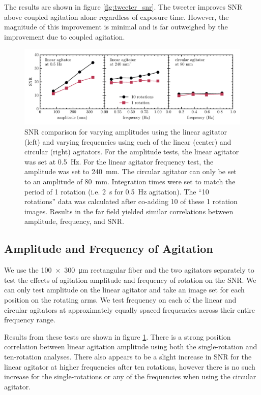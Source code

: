 \documentclass[twocolumn]{emulateapj}
\begin{document}
The results are shown in figure \ref{fig:tweeter_snr}. The tweeter improves SNR above coupled agitation alone regardless of exposure time. However, the magnitude of this improvement is minimal and is far outweighed by the improvement due to coupled agitation.

\begin{figure}[t]
\centering
	\includegraphics[width=\textwidth]{images/amp_freq_snr.pdf}
	\caption{SNR comparison for varying amplitudes using the linear agitator (left) and varying frequencies using each of the linear (center) and circular (right) agitators. For the amplitude tests, the linear agitator was set at \SI{0.5}{\hertz}. For the linear agitator frequency test, the amplitude was set to \SI{240}{\milli\meter}. The circular agitator can only be set to an amplitude of \SI{80}{\milli\meter}. Integration times were set to match the period of 1 rotation (i.e. \SI{2}{\second} for \SI{0.5}{\hertz} agitation). The ``10 rotations'' data was calculated after co-adding 10 of these 1 rotation images. Results in the far field yielded similar correlations between amplitude, frequency, and SNR.}
\label{fig:amp_freq_snr}
\end{figure}

\subsection{Amplitude and Frequency of Agitation}
\label{subsec:amp_freq}

We use the \SI{100x300}{\micro\meter} rectangular fiber and the two agitators separately to test the effects of agitation amplitude and frequency of rotation on the SNR. We can only test amplitude on the linear agitator and take an image set for each position on the rotating arms. We test frequency on each of the linear and circular agitators at approximately equally spaced frequencies across their entire frequency range.

Results from these tests are shown in figure \ref{fig:amp_freq_snr}. There is a strong position correlation between linear agitation amplitude using both the single-rotation and ten-rotation analyses. There also appears to be a slight increase in SNR for the linear agitator at higher frequencies after ten rotations, however there is no such increase for the single-rotations or any of the frequencies when using the circular agitator.
\end{document}
